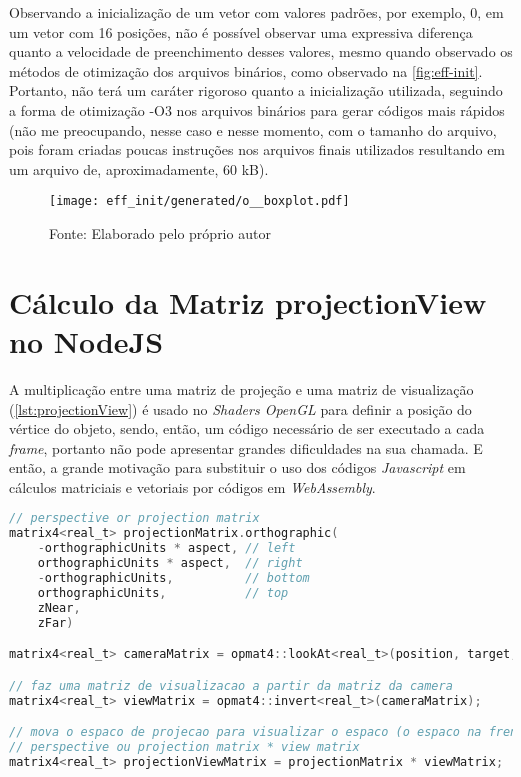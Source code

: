 \documentclass{article}
\begin{document}
Observando a inicialização de um vetor com valores padrões, por exemplo, 0, em um vetor com 16 posições, não é possível observar uma expressiva diferença quanto a velocidade de preenchimento desses valores, mesmo quando observado os métodos de otimização dos arquivos binários, como observado na \autoref{fig:eff-init}. Portanto, não terá um caráter rigoroso quanto a inicialização utilizada, seguindo a forma de otimização -O3 nos arquivos binários para gerar códigos mais rápidos (não me preocupando, nesse caso e nesse momento, com o tamanho do arquivo, pois foram criadas poucas instruções nos arquivos finais utilizados resultando em um arquivo de, aproximadamente, 60 kB).

\begin{figure}[H]
    \centering
    
    \vspace{5pt}
    \texttt{[image: eff\_init/generated/o\_\_boxplot.pdf]}
    \vspace{5pt}
    {\par\small Fonte: Elaborado pelo próprio autor}
    
    \label{fig:eff-init}
\end{figure}

\section*{Cálculo da Matriz projectionView no NodeJS}

A multiplicação entre uma matriz de projeção e uma matriz de visualização (\autoref{lst:projectionView}) é usado no \textit{Shaders OpenGL} para definir a posição do vértice do objeto, sendo, então, um código necessário de ser executado a cada \textit{frame}, portanto não pode apresentar grandes dificuldades na sua chamada. E então, a grande motivação para substituir o uso dos códigos \textit{Javascript} em cálculos matriciais e vetoriais por códigos em \textit{WebAssembly}.

\begin{lstlisting}[language=c,style=m_lststyle,label=lst:projectionView,caption=Cálculo da Matriz projectionView]
// perspective or projection matrix
matrix4<real_t> projectionMatrix.orthographic(
    -orthographicUnits * aspect, // left
    orthographicUnits * aspect,  // right
    -orthographicUnits,          // bottom
    orthographicUnits,           // top
    zNear,
    zFar)

matrix4<real_t> cameraMatrix = opmat4::lookAt<real_t>(position, target, yAxis);

// faz uma matriz de visualizacao a partir da matriz da camera
matrix4<real_t> viewMatrix = opmat4::invert<real_t>(cameraMatrix);

// mova o espaco de projecao para visualizar o espaco (o espaco na frente da camera)
// perspective ou projection matrix * view matrix
matrix4<real_t> projectionViewMatrix = projectionMatrix * viewMatrix;
\end{lstlisting}
\end{document}
